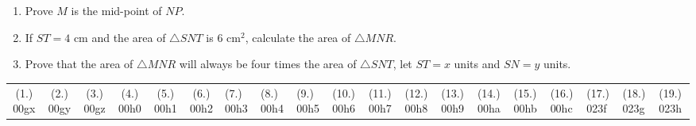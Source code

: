 \begin{eocexercises}{}
\begin{enumerate}[itemsep=20pt, label=\textbf{\arabic*}.]
\begin{center}
{}
\end{center}
\begin{enumerate}[noitemsep, label=\textbf{(\alph*)} ]
\item Prove $M$ is the mid-point of $NP$.
\item If $ST=4$ cm and the area of $\triangle SNT$ is $6$ cm$^2$, calculate the area of $\triangle MNR$.
\item Prove that the area of $\triangle MNR$ will always be four times the area of $\triangle SNT$, let $ST=x$ units and $SN=y$ units.
\end{enumerate}
\end{enumerate}
\practiceinfo
\par \begin{tabular}[h]{cccccc}
(1.) 00gx&  (2.) 00gy&  (3.) 00gz&  (4.) 00h0&  (5.) 00h1&  (6.) 00h2& 
(7.) 00h3&  (8.) 00h4&  (9.) 00h5&  (10.) 00h6&  (11.) 00h7&  (12.) 00h8& (13.) 00h9& (14.) 00ha& (15.) 00hb& (16.) 00hc & (17.) 023f &(18.) 023g &(19.) 023h \end{tabular}
\end{eocexercises}
